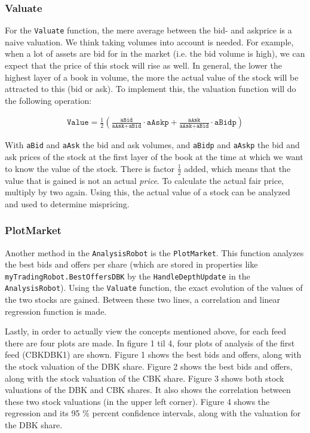 \documentclass[a4paper]{article}
\begin{document}
\subsubsection{Valuate}
For the \texttt{Valuate} function, the mere average between the bid- and askprice is a naive valuation. We think taking volumes into account is needed. For example, when a lot of assets are bid for in the market (i.e. the bid volume is high), we can expect that the price of this stock will rise as well. In general, the lower the highest layer of a book in volume, the more the actual value of the stock will be attracted to this (bid or ask). To implement this, the valuation function will do the following operation:

\begin{eqnarray}
\texttt{Value}=\frac{1}{2}(\frac{\texttt{aBid}}{\texttt{aAsk}+\texttt{aBid}}\cdot \texttt{aAskp}+\frac{\texttt{aAsk}}{\texttt{aAsk}+\texttt{aBid}}\cdot \texttt{aBidp})
\end{eqnarray}

With \texttt{aBid} and \texttt{aAsk} the bid and ask volumes, and \texttt{aBidp} and \texttt{aAskp} the bid and ask prices of the stock at the first layer of the book at the time at which we want to know the value of the stock. There is factor $\frac{1}{2}$ added, which means that the value that is gained is not an actual \textit{price}. To calculate the actual fair price, multiply by two again. Using this, the actual value of a stock can be analyzed and used to determine mispricing.

\subsubsection{PlotMarket}
Another method in the \texttt{AnalysisRobot} is the \texttt{PlotMarket}. This function analyzes the best bids and offers per share (which are stored in properties like \texttt{myTradingRobot.BestOffersDBK} by the \texttt{HandleDepthUpdate} in the \texttt{AnalysisRobot}). Using the \texttt{Valuate} function, the exact evolution of the values of the two stocks are gained. Between these two lines, a correlation and linear regression function is made.

Lastly, in order to actually view the concepts mentioned above, for each feed there are four plots are made. In figure 1 til 4, four plots of analysis of the first feed (CBKDBK1) are shown. Figure 1 shows the best bids and offers, along with the stock valuation of the DBK share. Figure 2 shows the best bids and offers, along with the stock valuation of the CBK share. Figure 3 shows both stock valuations of the DBK and CBK shares. It also shows the correlation between these two stock valuations (in the upper left corner). Figure 4 shows the regression and its 95 \% percent confidence intervals, along with the valuation for the DBK share.
\end{document}
